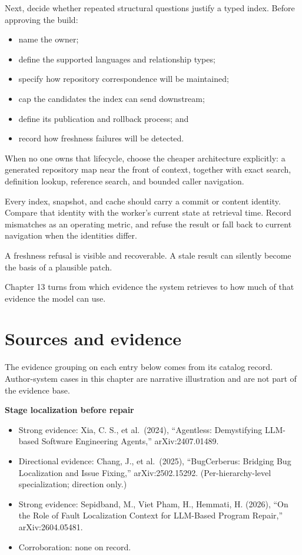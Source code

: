 Next, decide whether repeated structural questions justify a typed index. Before approving the build:

\begin{itemize}
\tightlist
\item
  name the owner;
\item
  define the supported languages and relationship types;
\item
  specify how repository correspondence will be maintained;
\item
  cap the candidates the index can send downstream;
\item
  define its publication and rollback process; and
\item
  record how freshness failures will be detected.
\end{itemize}

When no one owns that lifecycle, choose the cheaper architecture explicitly: a generated repository map near the front of context, together with exact search, definition lookup, reference search, and bounded caller navigation.

Every index, snapshot, and cache should carry a commit or content identity. Compare that identity with the worker's current state at retrieval time. Record mismatches as an operating metric, and refuse the result or fall back to current navigation when the identities differ.

A freshness refusal is visible and recoverable. A stale result can silently become the basis of a plausible patch.

Chapter 13 turns from which evidence the system retrieves to how much of that evidence the model can use.

\section*{Sources and evidence}

The evidence grouping on each entry below comes from its catalog record. Author-system cases in this chapter are narrative illustration and are not part of the evidence base.

\textbf{Stage localization before repair}

\begin{itemize}
\tightlist
\item
  Strong evidence: Xia, C. S., et al.~(2024), ``Agentless: Demystifying LLM-based Software Engineering Agents,'' arXiv:2407.01489.
\item
  Directional evidence: Chang, J., et al.~(2025), ``BugCerberus: Bridging Bug Localization and Issue Fixing,'' arXiv:2502.15292. (Per-hierarchy-level specialization; direction only.)
\item
  Strong evidence: Sepidband, M., Viet Pham, H., Hemmati, H. (2026), ``On the Role of Fault Localization Context for LLM-Based Program Repair,'' arXiv:2604.05481.
\item
  Corroboration: none on record.
\end{itemize}

